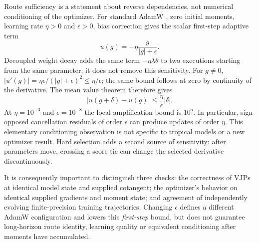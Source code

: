 Route sufficiency is a statement about reverse dependencies, not numerical
conditioning of the optimizer. For standard AdamW
\citep{loshchilov2019adamw}, zero initial moments, learning rate $\eta>0$
and $\epsilon>0$, bias correction gives the scalar first-step adaptive term
\begin{equation}
 u(g)=-\eta\frac{g}{|g|+\epsilon}.
 \label{eq:adamw-first-step}
\end{equation}
Decoupled weight decay adds the same term $-\eta\lambda\theta$ to two
executions starting from the same parameter; it does not remove this
sensitivity. For $g\ne0$,
$|u'(g)|=\eta\epsilon/(|g|+\epsilon)^2\le\eta/\epsilon$; the same
bound follows at zero by continuity of the derivative. The mean value
theorem therefore gives
\begin{equation}
 |u(g+\delta)-u(g)|\le\frac{\eta}{\epsilon}|\delta|.
\end{equation}
At $\eta=10^{-3}$ and $\epsilon=10^{-8}$ the local amplification bound is
$10^5$. In particular, sign-opposed cancellation residuals of order
$\epsilon$ can produce updates of order $\eta$. This elementary
conditioning observation is not specific to tropical models or a new
optimizer result. Hard selection adds a second source of sensitivity:
after parameters move, crossing a score tie can change the selected
derivative discontinuously.

It is consequently important to distinguish three checks: the correctness
of VJPs at identical model state and supplied cotangent; the optimizer's
behavior on identical supplied gradients and moment state; and agreement
of independently evolving finite-precision training trajectories. Changing
$\epsilon$ defines a different AdamW configuration and lowers this
\emph{first-step} bound, but does not guarantee long-horizon route identity,
learning quality or equivalent conditioning after moments have accumulated.
